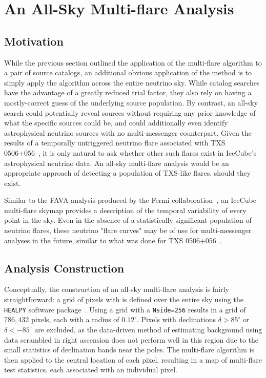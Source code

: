 \chapter{An All-Sky Multi-flare Analysis}\label{chapter:multiflareskymap}

\section{Motivation}
While the previous section outlined the application of the multi-flare algorithm to a pair of source catalogs, an additional obvious application of the method is to simply apply the algorithm across the entire neutrino sky. While catalog searches have the advantage of a greatly reduced trial factor, they also rely on having a mostly-correct guess of the underlying source population. By contrast, an all-sky search could potentially reveal sources without requiring any prior knowledge of what the specific sources could be, and could additionally even identify astrophysical neutrino sources with no multi-messenger counterpart. Given the results of a temporally untriggered neutrino flare associated with TXS 0506+056~\cite{TXS_Archival}, it is only natural to ask whether other such flares exist in IceCube's astrophysical neutrino data. An all-sky multi-flare analysis would be an appropriate approach of detecting a population of TXS-like flares, should they exist. 

Similar to the FAVA analysis produced by the Fermi collaboration~\cite{fava_paper}, an IceCube multi-flare skymap provides a description of the temporal variability of every point in the sky. Even in the absence of a statistically significant population of neutrino flares, these neutrino "flare curves" may be of use for multi-messenger analyses in the future, similar to what was done for TXS 0506+056~\cite{TXS_Archival}\cite{TXS_Multimessenger}.

\section{Analysis Construction}
Conceptually, the construction of an all-sky multi-flare analysis is fairly straightforward: a grid of pixels with  is defined over the entire sky using the \texttt{HEALPY} software package~\cite{healpy2019}. Using a  grid with a \texttt{Nside=256} results in a grid of $786,432$ pixels, each with a radius of $0.12^{\circ}$. Pixels with declinations $\delta>85^{\circ}$ or $\delta<-85^{\circ}$ are excluded, as the data-driven method of estimating background using data scrambled in right ascension does not perform well in this region due to the small statistics of declination bands near the poles. The multi-flare algorithm is then applied to the central location of each pixel, resulting in a map of multi-flare test statistics, each associated with an individual pixel. 

